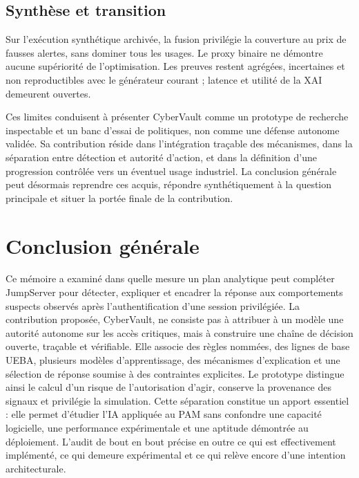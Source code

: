 \documentclass[11pt,a4paper,oneside]{report}
\theoremstyle{definition}
\theoremstyle{plain}
\begin{document}
\section{Synthèse et transition}

Sur l'exécution synthétique archivée, la fusion privilégie la couverture au
prix de fausses alertes, sans dominer tous les usages. Le proxy binaire ne
démontre aucune supériorité de l'optimisation. Les preuves restent agrégées,
incertaines et non reproductibles avec le générateur courant ; latence et
utilité de la XAI demeurent ouvertes.

Ces limites conduisent à présenter CyberVault comme un prototype de recherche
inspectable et un banc d'essai de politiques, non comme une défense autonome
validée. Sa contribution réside dans l'intégration traçable des mécanismes,
dans la séparation entre détection et autorité d'action, et dans la définition
d'une progression contrôlée vers un éventuel usage industriel. La conclusion
générale peut désormais reprendre ces acquis, répondre synthétiquement à la
question principale et situer la portée finale de la contribution.

\chapter{Conclusion générale}
\label{chap:conclusion}

Ce mémoire a examiné dans quelle mesure un plan analytique peut compléter JumpServer pour détecter, expliquer et encadrer la réponse aux comportements suspects observés après l'authentification d'une session privilégiée. La contribution proposée, CyberVault, ne consiste pas à attribuer à un modèle une autorité autonome sur les accès critiques, mais à construire une chaîne de décision ouverte, traçable et vérifiable. Elle associe des règles nommées, des lignes de base UEBA, plusieurs modèles d'apprentissage, des mécanismes d'explication et une sélection de réponse soumise à des contraintes explicites. Le prototype distingue ainsi le calcul d'un risque de l'autorisation d'agir, conserve la provenance des signaux et privilégie la simulation. Cette séparation constitue un apport essentiel : elle permet d'étudier l'IA appliquée au PAM sans confondre une capacité logicielle, une performance expérimentale et une aptitude démontrée au déploiement. L'audit de bout en bout précise en outre ce qui est effectivement implémenté, ce qui demeure expérimental et ce qui relève encore d'une intention architecturale.
\end{document}
